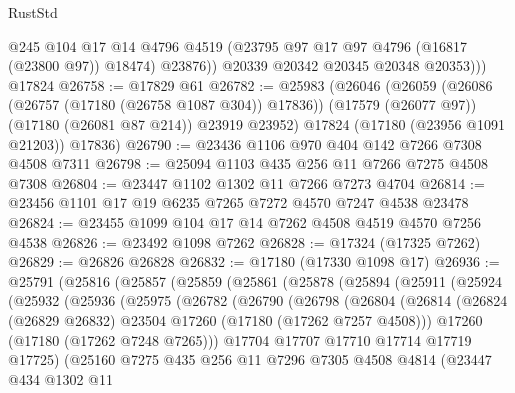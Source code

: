 \begin{lexlean}{RustStd}
\begin{coremodule}
{\begin{coremodule}
{{{{{{{{{{{{{{{{{{{{{{{{{{{{{{{{{{{{{{{{{{{{{{{{{{{{{{{              @245
              @104
              @17
              @14
              @4796
              @4519
              (@23795 @97 @17 @97 @4796 (@16817 (@23800 @97)) @18474)
              @23876))
          @20339
          @20342
          @20345
          @20348
          @20353)))
    @17824
@26758 := @17829 @61
@26782 := @25983
    (@26046
      (@26059
        (@26086 (@26757 (@17180 (@26758 @1087 @304)) @17836))
        (@17579 (@26077 @97))
        (@17180 (@26081 @87 @214))
        @23919
        @23952)
      @17824
      (@17180 (@23956 @1091 @21203))
      @17836)
@26790 := @23436 @1106 @970 @404 @142 @7266 @7308 @4508 @7311
@26798 := @25094 @1103 @435 @256 @11 @7266 @7275 @4508 @7308
@26804 := @23447 @1102 @1302 @11 @7266 @7273 @4704
@26814 := @23456 @1101 @17 @19 @6235 @7265 @7272 @4570 @7247 @4538 @23478
@26824 := @23455 @1099 @104 @17 @14 @7262 @4508 @4519 @4570 @7256 @4538
@26826 := @23492 @1098 @7262
@26828 := @17324 (@17325 @7262)
@26829 := @26826 @26828
@26832 := @17180 (@17330 @1098 @17)
@26936 := @25791
    (@25816
      (@25857
        (@25859
          (@25861
            (@25878
              (@25894
                (@25911
                  (@25924
                    (@25932
                      (@25936
                        (@25975
                          (@26782
                            (@26790
                              (@26798
                                (@26804
                                  (@26814
                                    (@26824
                                      (@26829 @26832)
                                      @23504
                                      @17260
                                      (@17180 (@17262 @7257 @4508)))
                                    @17260
                                    (@17180 (@17262 @7248 @7265)))
                                  @17704
                                  @17707
                                  @17710
                                  @17714
                                  @17719
                                  @17725)
                                (@25160
                                  @7275
                                  @435
                                  @256
                                  @11
                                  @7296
                                  @7305
                                  @4508
                                  @4814
                                  (@23447
                                    @434
                                    @1302
                                    @11
}}}}}}}}}}}}}}}}}}}}}}}}}}}}}}}}}}}}}}}}}}}}}}}}}}}}}}}
\end{coremodule}}
\end{coremodule}
\end{lexlean}
